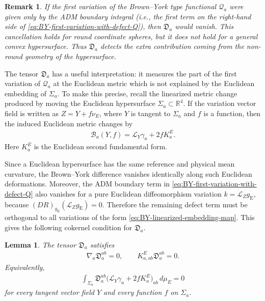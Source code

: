 \documentclass[10pt,a4paper]{amsart}
\newcommand{\R}{\mathbb{R}}
\newcommand{\gE}{g_{\mathrm{E}}}
\newcommand{\Lie}{\mathcal{L}}
\newtheorem{lemma}[theorem]{Lemma}
\newtheorem{remark}[theorem]{Remark}
\begin{document}
	
	\begin{remark}
		If the first variation of the Brown--York type functional $\mathcal Q_a$ were given only by
		the ADM boundary integral (i.e., the first term on the right-hand side of \eqref{eq:BY-first-variation-with-defect-Q}), then $\mathfrak D_a$ would vanish. This cancellation holds for round coordinate
		spheres, but it does not hold for a general convex hypersurface. Thus
		$\mathfrak D_a$ detects the extra
		contribution coming from the non-round geometry of the hypersurface.
	\end{remark}
	
	\medskip
	
	The tensor $\mathfrak D_a$ has a useful interpretation: it measures the part of
	the first variation of $\mathcal Q_a$ at the Euclidean metric which is not
	explained by the Euclidean embedding of $\Sigma_a$. To make this precise, recall
	the linearized metric change produced by moving the Euclidean hypersurface
	$\Sigma_a\subset\R^4$. If the variation vector field is written as
	$Z=Y+f\nu_E$, where $Y$ is tangent to $\Sigma_a$ and $f$ is a function, then the
	induced Euclidean metric changes by
	\begin{align}\label{eq:BY-linearized-embedding-map}
		\mathscr B_a(Y,f)
		=
		\Lie_Y\gamma_a+2fK_a^E .
	\end{align}
	Here $K_a^E$ is the Euclidean second fundamental form.
	
	Since a Euclidean hypersurface has the same reference and physical mean
	curvature, the Brown--York difference vanishes identically along such Euclidean
	deformations. Moreover, the ADM boundary term in
	\eqref{eq:BY-first-variation-with-defect-Q} also vanishes for a pure Euclidean
	diffeomorphism variation $k=\Lie_Z\gE$, because
	$(DR)_{\gE}(\Lie_Z\gE)=0$. Therefore the remaining defect term must be
	orthogonal to all variations of the form
	\eqref{eq:BY-linearized-embedding-map}. This gives the following cokernel
	condition for $\mathfrak D_a$.
	
	\begin{lemma}\label{lem:BY-defect-cokernel}
		The tensor $\mathfrak D_a$ satisfies
		\begin{align}\label{eq:BY-defect-cokernel-equations}
			\nabla_a\mathfrak D_a^{ab}=0,
			\qquad
			K^E_{a,ab}\mathfrak D_a^{ab}=0 .
		\end{align}
		Equivalently,
		\begin{align}\label{eq:integral-orthogonality}
			\int_{\Sigma_a}
			\mathfrak D_a^{ab}
			\bigl(\Lie_Y\gamma_a+2fK_a^E\bigr)_{ab}\,d\mu_E
			=
			0
		\end{align}
		for every tangent vector field $Y$ and every function $f$ on $\Sigma_a$.
	\end{lemma}
	
\end{document}
